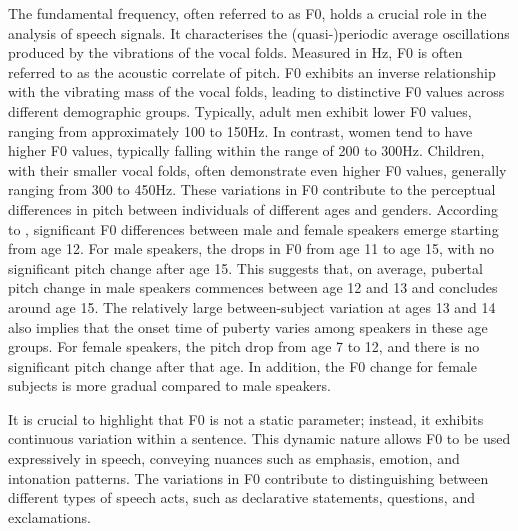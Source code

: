 The fundamental frequency, often referred to as F0, holds a crucial role in the analysis of speech signals. It characterises the (quasi-)periodic average oscillations produced by the vibrations of the vocal folds. Measured in Hz, F0 is often referred to as the acoustic correlate of pitch. F0 exhibits an inverse relationship with the vibrating mass of the vocal folds, leading to distinctive F0 values across different demographic groups. Typically, adult men exhibit lower F0 values, ranging from approximately 100 to 150Hz. In contrast, women tend to have higher F0 values, typically falling within the range of 200 to 300Hz. Children, with their smaller vocal folds, often demonstrate even higher F0 values, generally ranging from 300 to 450Hz. These variations in F0 contribute to the perceptual differences in pitch between individuals of different ages and genders. 
According to \cite{Acoustic_change_children}, significant F0 differences between male and female speakers emerge starting from age 12. For male speakers, the drops in F0 from age 11 to age 15, with no significant pitch change after age 15. This suggests that, on average, pubertal pitch change in male speakers commences between age 12 and 13 and concludes around age 15. The relatively large between-subject variation at ages 13 and 14 also implies that the onset time of puberty varies among speakers in these age groups. For female speakers, the pitch drop from age 7 to 12, and there is no significant pitch change after that age. In addition, the F0 change for female subjects is more gradual compared to male speakers.

It is crucial to highlight that F0 is not a static parameter; instead, it exhibits continuous variation within a sentence. This dynamic nature allows F0 to be used expressively in speech, conveying nuances such as emphasis, emotion, and intonation patterns. The variations in F0 contribute to distinguishing between different types of speech acts, such as declarative statements, questions, and exclamations.


